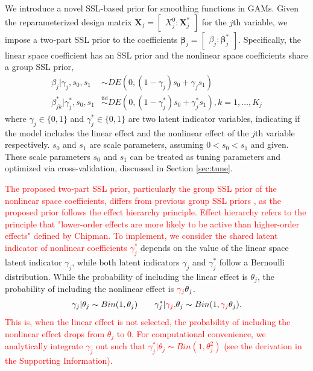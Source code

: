 \documentclass[AMA,STIX1COL,]{WileyNJD-v2}
\begin{document}
We introduce a novel SSL-based prior for smoothing functions in GAMs.
Given the reparameterized design matrix
\(\boldsymbol{X}_j = \begin{bmatrix} X^0_j : \boldsymbol{X}_j^*\end{bmatrix}\)
for the \(j\)th variable, we impose a two-part SSL prior to the
coefficients
\(\boldsymbol{\beta}_j = \begin{bmatrix} \beta_j : \boldsymbol{\beta}_j^*\end{bmatrix}\).
Specifically, the linear space coefficient has an SSL prior and the
nonlinear space coefficients share a group SSL prior,
\begin{align}\label{eq:bham_ssl}
  \beta_{j} | \gamma_{j},s_0,s_1 &\sim DE(0,(1-\gamma_{j}) s_0 + \gamma_{j} s_1) \nonumber \\
  \beta^*_{jk} | \gamma^*_{j},s_0,s_1 &\overset{\text{iid}}{\sim}DE(0,(1-\gamma^*_{j}) s_0 + \gamma^*_{j} s_1), k=1,\dots, K_j
\end{align} where \(\gamma_{j}\in\{0,1\}\) and
\(\gamma^*_{j}\in \{0,1\}\) are two latent indicator variables,
indicating if the model includes the linear effect and the nonlinear
effect of the \(j\)th variable respectively. \(s_0\) and \(s_1\) are
scale parameters, assuming \(0 < s_0 < s_1\) and given. These scale
parameters \(s_0\) and \(s_1\) can be treated as tuning parameters and
optimized via cross-validation, discussed in Section \ref{sec:tune}.

\textcolor{red}{The proposed two-part SSL prior, particularly the group SSL prior of the nonlinear space coefficients, differs from previous group SSL priors \cite{Tang2018, Tang2019}, as the proposed prior follows the effect hierarchy principle. Effect hierarchy refers to the principle that "lower-order effects are more likely to be active than higher-order effects" defined by Chipman\cite{chipman2006prior}. To implement, we consider the shared latent indicator of nonlinear coefficients $\gamma^*_j$}
depends on the value of the linear space latent indicator \(\gamma_j\),
while both latent indicators \(\gamma_j\) and \(\gamma^*_j\) follow a
Bernoulli distribution. While the probability of including the linear
effect is \(\theta_j\), the probability of including the nonlinear
effect is \(\textcolor{red}{\gamma_{j}}\theta_j\). \[
\begin{aligned}
&\gamma_{j} | \theta_j \sim Bin(1, \theta_j) & & 
&\gamma_{j}^*| \textcolor{red}{\gamma_{j}, } \theta_j \sim Bin(1, \textcolor{red}{\gamma_{j}}\theta_j).
\end{aligned}
\]
\textcolor{red}{This is, when the linear effect is not selected, the probability of including the nonlinear effect drops from $\theta_j$ to 0. For computational convenience, we analytically integrate $\gamma_j$ out such that $\gamma_{j}^*| \theta_j \sim Bin(1, \theta_j^2)$ (see the derivation in the Supporting Information).
}
\end{document}
